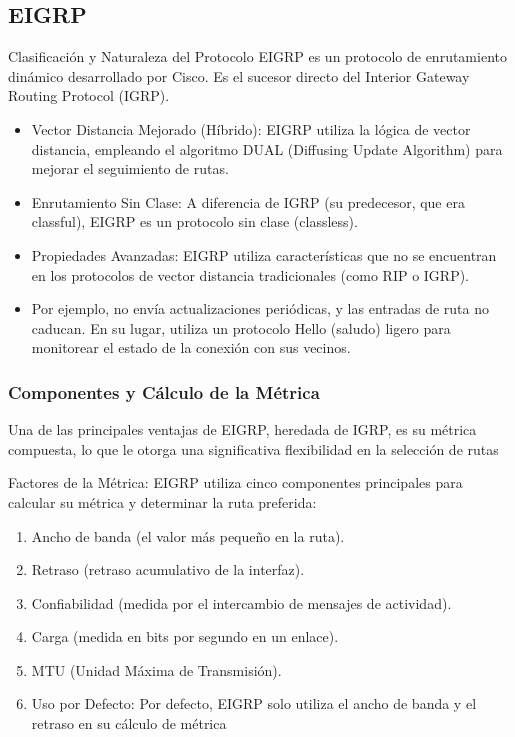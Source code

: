\documentclass[a5paper]{book}%
\begin{document}
  \subsection{EIGRP} 
  
  Clasificación y Naturaleza del Protocolo
  EIGRP es un protocolo de enrutamiento dinámico desarrollado por Cisco. Es el sucesor directo del Interior Gateway Routing Protocol (IGRP).
  
  \begin{itemize}
  	\item Vector Distancia Mejorado (Híbrido): EIGRP utiliza la lógica de vector distancia, empleando el algoritmo DUAL (Diffusing Update Algorithm) para mejorar el seguimiento de rutas.
  	\item Enrutamiento Sin Clase: A diferencia de IGRP (su predecesor, que era classful), EIGRP es un protocolo sin clase (classless).
  	\item Propiedades Avanzadas: EIGRP utiliza características que no se encuentran en los protocolos de vector distancia tradicionales (como RIP o IGRP).
  	\item Por ejemplo, no envía actualizaciones periódicas, y las entradas de ruta no caducan. En su lugar, utiliza un protocolo Hello (saludo) ligero para monitorear el estado de la conexión con sus vecinos.
  \end{itemize}
  
  
  \subsubsection{Componentes y Cálculo de la Métrica}
  Una de las principales ventajas de EIGRP, heredada de IGRP, es su métrica compuesta, lo que le otorga una significativa flexibilidad en la selección de rutas
  
 Factores de la Métrica: EIGRP utiliza cinco componentes principales para calcular su métrica y determinar la ruta preferida:
 
 \begin{enumerate}
 	\item Ancho de banda (el valor más pequeño en la ruta).
 	\item Retraso (retraso acumulativo de la interfaz).
 	\item Confiabilidad (medida por el intercambio de mensajes de actividad).
 	\item Carga (medida en bits por segundo en un enlace).
 	\item MTU (Unidad Máxima de Transmisión).
 	\item Uso por Defecto: Por defecto, EIGRP solo utiliza el ancho de banda y el retraso en su cálculo de métrica
 \end{enumerate}
 
\end{document}
